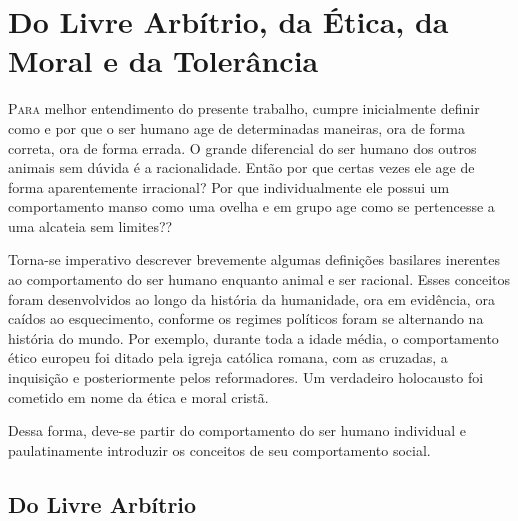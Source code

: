 \documentclass[
	12pt,				%
	openright,			%
	twoside,			%
	a4paper,			%
	chapter=TITLE,		%
	section=TITLE,		%
	subsection=TITLE,	%
	subsubsection=TITLE,%
	spanish,            %
	english,			%
	brazil				%
	]{abntex2}
\begin{document}
\section{Do Livre Arbítrio, da Ética, da Moral e da Tolerância}

\lettrine[lines=2, lhang=0.33, loversize=0.25]{P}{ara} melhor entendimento do presente trabalho, cumpre inicialmente definir como e por que o ser humano age de determinadas maneiras, ora de forma correta, ora de forma errada. O grande diferencial do ser humano dos outros animais sem dúvida é a racionalidade. Então por que certas vezes ele age de forma aparentemente irracional? Por que individualmente ele possui um comportamento manso como uma ovelha e em grupo age como se pertencesse a uma alcateia sem limites??
\par 
Torna-se imperativo descrever brevemente algumas definições basilares inerentes ao comportamento do ser humano enquanto animal e ser racional.
Esses conceitos foram desenvolvidos ao longo da história da humanidade, ora em evidência, ora
caídos ao esquecimento, conforme os regimes políticos foram se alternando na história do mundo.
Por exemplo, durante toda a idade média, o comportamento ético europeu foi ditado pela igreja católica
romana, com as cruzadas, a inquisição e posteriormente pelos reformadores. Um verdadeiro holocausto foi cometido em nome da ética e moral cristã.
\par 
Dessa forma, deve-se partir do comportamento do ser humano individual e paulatinamente introduzir os conceitos de seu comportamento social.
\subsection{Do Livre Arbítrio}
\end{document}

